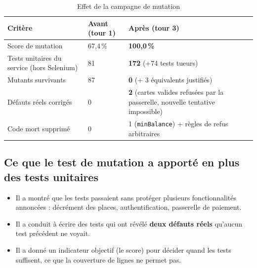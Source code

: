 \documentclass[12pt,a4paper]{article}
\begin{document}
\begin{table}[H]
\centering
\small
\begin{tabular}{p{6cm}p{3.2cm}p{5.4cm}}
\toprule
\textbf{Critère} & \textbf{Avant (tour 1)} & \textbf{Après (tour 3)} \\
\midrule
Score de mutation & 67{,}4\,\% & \textbf{100{,}0\,\%} \\
Tests unitaires du service (hors Selenium) & 81 & \textbf{172} (+74 tests tueurs) \\
Mutants survivants & 87 & \textbf{0} (+ 3 équivalents justifiés) \\
Défauts réels corrigés & 0 & \textbf{2} (cartes valides refusées par la passerelle, nouvelle tentative impossible) \\
Code mort supprimé & 0 & 1 (\texttt{minBalance}) + règles de refus arbitraires \\
\bottomrule
\end{tabular}
\caption{Effet de la campagne de mutation}
\end{table}

\subsection{Ce que le test de mutation a apporté en plus des tests unitaires}
\begin{itemize}
    \item Il a montré que les tests passaient sans protéger plusieurs fonctionnalités annoncées : décrément des places, authentification, passerelle de paiement.
    \item Il a conduit à écrire des tests qui ont révélé \textbf{deux défauts réels} qu'aucun test précédent ne voyait.
    \item Il a donné un indicateur objectif (le score) pour décider quand les tests suffisent, ce que la couverture de lignes ne permet pas.
\end{itemize}
\end{document}
